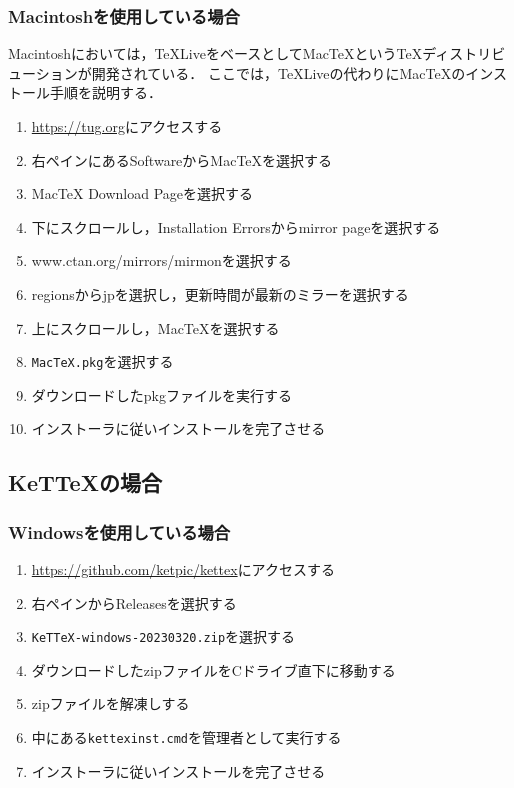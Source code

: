 \subsubsection{Macintoshを使用している場合}
Macintoshにおいては，{\TeX}LiveをベースとしてMac{\TeX}という{\TeX}ディストリビューションが開発されている．
ここでは，{\TeX}Liveの代わりにMac{\TeX}のインストール手順を説明する．
\begin{enumerate}
    \item \url{https://tug.org}にアクセスする
    \item 右ペインにあるSoftwareからMacTeXを選択する
    \item MacTeX Download Pageを選択する
    \item 下にスクロールし，Installation Errorsからmirror pageを選択する
    \item www.ctan.org/mirrors/mirmonを選択する
    \item regionsからjpを選択し，更新時間が最新のミラーを選択する
    \item 上にスクロールし，MacTeXを選択する
    \item \verb|MacTeX.pkg|を選択する
    \item ダウンロードしたpkgファイルを実行する
    \item インストーラに従いインストールを完了させる
\end{enumerate}

\subsection{KeT{\TeX}の場合}

\subsubsection{Windowsを使用している場合}
\begin{enumerate}
    \item \url{https://github.com/ketpic/kettex}にアクセスする
    \item 右ペインからReleasesを選択する
    \item \verb|KeTTeX-windows-20230320.zip|を選択する
    \item ダウンロードしたzipファイルをCドライブ直下に移動する
    \item zipファイルを解凍しする
    \item 中にある\verb|kettexinst.cmd|を管理者として実行する
    \item インストーラに従いインストールを完了させる
\end{enumerate}

